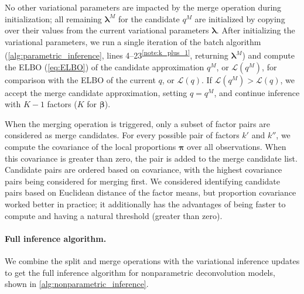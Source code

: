 \documentclass[twoside,11pt]{article}
\begin{document}
No other variational parameters are impacted by the merge operation during initialization; all remaining $\boldsymbol{\lambda}^M$ for the candidate $q^M$ are initialized by copying over their values from the current variational parameters $\boldsymbol{\lambda}$.
After initializing the variational parameters, we run a single iteration of the batch algorithm (\cref{alg:parametric_inference}, lines 4--23\textsuperscript{\ref{note:k_plus_1}}, returning $\boldsymbol{\lambda}^M$) and compute the ELBO (\cref{eq:ELBO}) of the candidate approximation $q^M$, or $\mathcal{L}(q^M)$, for comparison with the ELBO of the current $q$, or $\mathcal{L}(q)$.  If $\mathcal{L}(q^M) > \mathcal{L}(q)$, we accept the merge candidate approximation, setting $q=q^M$, and continue inference with $K-1$ factors ($K$ for $\boldsymbol{\beta}$).

When the merging operation is triggered, only a subset of factor pairs are considered as merge candidates.  For every possible pair of factors $k'$ and $k''$, we compute the covariance of the local proportions $\boldsymbol{\pi}$ over all observations.  When this covariance is greater than zero, the pair is added to the merge candidate list.  Candidate pairs are ordered based on covariance, with the highest covariance pairs being considered for merging first.  We considered 
identifying candidate pairs based on Euclidean distance of the factor means, but proportion covariance worked better in practice; it additionally has the advantages of being faster to compute and having a natural threshold (greater than zero).

\paragraph{Full inference algorithm.}  We combine the split and merge operations with the variational inference updates to get the full inference algorithm for nonparametric deconvolution models, shown in \cref{alg:nonparametric_inference}.
\end{document}
